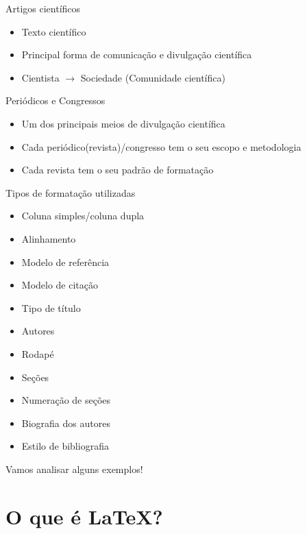 \documentclass[aspectratio=169,xcolor=dvipsnames]{beamer}
\begin{document}
\begin{frame}{Artigos científicos}

    \begin{itemize}
        \item Texto científico
        \item Principal forma de comunicação e divulgação científica
        \item Cientista $\rightarrow$ Sociedade (Comunidade científica)
    \end{itemize}

\end{frame}

\begin{frame}{Periódicos e Congressos}
    \begin{itemize}
        \item Um dos principais meios de divulgação científica
        \item Cada periódico(revista)/congresso tem o seu escopo e metodologia
        \item Cada revista tem o seu padrão de formatação
    \end{itemize}
\end{frame}
    
\begin{frame}{Tipos de formatação utilizadas}
    \begin{itemize}
        \item Coluna simples/coluna dupla
        \item Alinhamento
        \item Modelo de referência
        \item Modelo de citação
        \item Tipo de título
        \item Autores 
        \item Rodapé
        \item Seções
        \item Numeração de seções
        \item Biografia dos autores 
        \item Estilo de bibliografia
    \end{itemize}
    Vamos analisar alguns exemplos!
\end{frame}

\section{O que é \LaTeX?}
\end{document}

